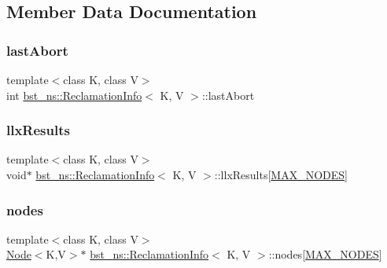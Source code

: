 \subsection{Member Data Documentation}
\mbox{\label{classbst__ns_1_1ReclamationInfo_aea753345c52d877c29aff867f58dbe5f}} 
\subsubsection{\texorpdfstring{last\+Abort}{lastAbort}}
{\footnotesize\ttfamily template$<$class K, class V$>$ \\
int \hyperlink{classbst__ns_1_1ReclamationInfo}{bst\+\_\+ns\+::\+Reclamation\+Info}$<$ K, V $>$\+::last\+Abort}

\mbox{\label{classbst__ns_1_1ReclamationInfo_aa12e3a5b91c393d63de9582d26c88525}} 
\subsubsection{\texorpdfstring{llx\+Results}{llxResults}}
{\footnotesize\ttfamily template$<$class K, class V$>$ \\
void$\ast$ \hyperlink{classbst__ns_1_1ReclamationInfo}{bst\+\_\+ns\+::\+Reclamation\+Info}$<$ K, V $>$\+::llx\+Results\mbox{[}\hyperlink{scxrecord_8h_abd2aacdca9cb2a1a30f3392256b96ea3}{M\+A\+X\+\_\+\+N\+O\+D\+ES}\mbox{]}}

\mbox{\label{classbst__ns_1_1ReclamationInfo_aba682f7f7dacd2c3e8adf2ccf8a17073}} 
\subsubsection{\texorpdfstring{nodes}{nodes}}
{\footnotesize\ttfamily template$<$class K, class V$>$ \\
\hyperlink{classbst__ns_1_1Node}{Node}$<$K,V$>$$\ast$ \hyperlink{classbst__ns_1_1ReclamationInfo}{bst\+\_\+ns\+::\+Reclamation\+Info}$<$ K, V $>$\+::nodes\mbox{[}\hyperlink{scxrecord_8h_abd2aacdca9cb2a1a30f3392256b96ea3}{M\+A\+X\+\_\+\+N\+O\+D\+ES}\mbox{]}}


